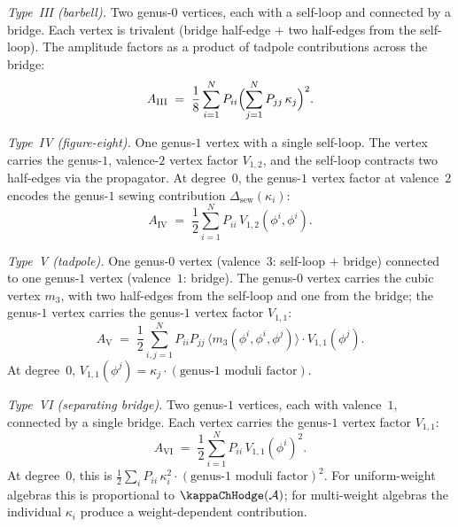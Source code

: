 \begin{construction}
\medskip\noindent
\emph{Type~III (barbell).} Two genus-$0$ vertices, each with a
self-loop and connected by a bridge. Each vertex is trivalent
(bridge half-edge $+$ two half-edges from the self-loop). The
amplitude factors as a product of tadpole contributions across
the bridge:
\begin{equation}\label{eq:gamma-III}
A_{\mathrm{III}} \;=\; \frac{1}{8}
\sum_{i=1}^N P_{ii}
\Bigl(\sum_{j=1}^N P_{jj}\,\kappa_j \Bigr)^2.
\end{equation}

\medskip\noindent
\emph{Type~IV (figure-eight).} One genus-$1$ vertex with a
single self-loop. The vertex carries the genus-$1$, valence-$2$
vertex factor $V_{1,2}$, and the self-loop contracts two
half-edges via the propagator. At degree~$0$, the genus-$1$
vertex factor at valence~$2$ encodes the genus-$1$ sewing
contribution $\Delta_{\mathrm{sew}}(\kappa_i)$:
\begin{equation}\label{eq:gamma-IV}
A_{\mathrm{IV}} \;=\; \frac{1}{2}
\sum_{i=1}^N P_{ii}\, V_{1,2}(\phi^i, \phi^i).
\end{equation}

\medskip\noindent
\emph{Type~V (tadpole).} One genus-$0$ vertex (valence~$3$:
self-loop $+$ bridge) connected to one genus-$1$ vertex
(valence~$1$: bridge). The genus-$0$ vertex carries the cubic
vertex $m_3$, with two half-edges from the self-loop and one
from the bridge; the genus-$1$ vertex carries the genus-$1$
vertex factor $V_{1,1}$:
\begin{equation}\label{eq:gamma-V}
A_{\mathrm{V}} \;=\; \frac{1}{2}
\sum_{i,j=1}^N P_{ii} P_{jj}\,
\bigl\langle m_3(\phi^i, \phi^i, \phi^j) \bigr\rangle
\cdot V_{1,1}(\phi^j).
\end{equation}
At degree~$0$, $V_{1,1}(\phi^j) = \kappa_j \cdot
(\text{genus-$1$ moduli factor})$.

\medskip\noindent
\emph{Type~VI (separating bridge).} Two genus-$1$ vertices,
each with valence~$1$, connected by a single bridge. Each
vertex carries the genus-$1$ vertex factor $V_{1,1}$:
\begin{equation}\label{eq:gamma-VI}
A_{\mathrm{VI}} \;=\; \frac{1}{2}
\sum_{i=1}^N P_{ii}\, V_{1,1}(\phi^i)^2.
\end{equation}
At degree~$0$, this is $\frac{1}{2} \sum_i P_{ii}\, \kappa_i^2
\cdot (\text{genus-$1$ moduli factor})^2$. For uniform-weight
algebras this is proportional to $\kappaChHodge(\cA)$; for multi-weight
algebras the individual $\kappa_i$ produce a weight-dependent
contribution.
\end{construction}

